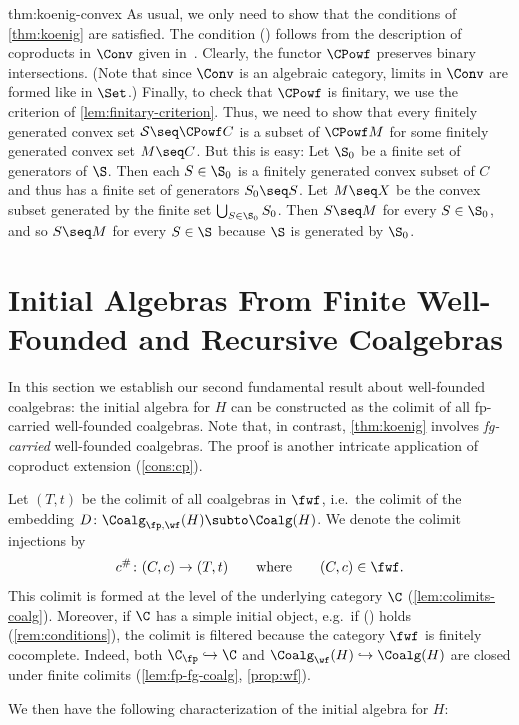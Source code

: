 \begin{proofappendix}{thm:koenig-convex}
As usual, we only need to show that the conditions of \autoref{thm:koenig} are satisfied. The condition (\injmono) follows from the description of coproducts in $\Conv$ given in~\cite[Prop.~5]{jww15}. Clearly, the functor $\CPowf$ preserves binary intersections. (Note that since $\Conv$ is an algebraic category, limits in $\Conv$ are formed like in $\Set$.) Finally, to check that $\CPowf$ is finitary, we use the criterion of \autoref{lem:finitary-criterion}. Thus, we need to show that every finitely generated convex set $\mathcal{S}\seq \CPowf C$ is a subset of $\CPowf M$ for some finitely generated convex set $M\seq C$. But this is easy: Let $\S_0$ be a finite set of generators of $\S$. Then each $S\in \S_0$ is a finitely generated convex subset of $C$ and thus has a finite set of generators $S_0\seq S$. Let $M\seq X$ be the convex subset generated by the finite set $\bigcup_{S\in \S_0} S_0$. Then $S\seq M$ for every $S\in \S_0$, and so $S\seq M$ for every $S\in \S$ because $\S$ is generated by $\S_0$.
\end{proofappendix}

\section{Initial Algebras From Finite Well-Founded and Recursive Coalgebras}\label{sec:initial-algebras}
In this section we establish our second fundamental result about well-founded coalgebras: the initial algebra for $H$ can be constructed as the colimit of all fp-carried well-founded coalgebras. Note that, in contrast, \autoref{thm:koenig} involves \emph{fg-carried} well-founded coalgebras. The proof is another intricate application of coproduct extension (\autoref{cons:cp}).

\begin{construction}\label{not:T}
Let $(T,t)$ be the colimit of all coalgebras in $\fwf$, i.e.\ the colimit of the embedding
$D\colon \Coalg_{\fp,\wf}(H)\subto \Coalg(H)$.
We denote the colimit injections by
\[ c^\#\colon (C,c)\to (T,t) \qquad \text{where} \qquad (C,c)\in \fwf. \]
This colimit is formed at the level of the underlying category $\C$ (\autoref{lem:colimits-coalg}). Moreover, if $\C$  has a simple initial object, e.g.~if (\injmono) holds (\autoref{rem:conditions}), the colimit is filtered because the category $\fwf$ is finitely cocomplete. Indeed, both $\C_\fp\hookrightarrow \C$ and $\Coalg_\wf(H)\hookrightarrow \Coalg(H)$ are closed under finite colimits (\autoref{lem:fp-fg-coalg}, \autoref{prop:wf}).
\end{construction}
We then have the following characterization of the initial algebra for $H$:

